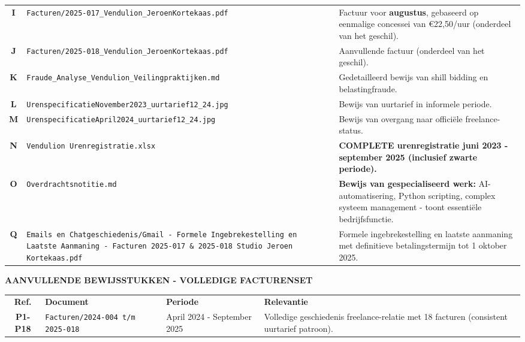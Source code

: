 \documentclass[10pt,a4paper]{article}
\begin{document}
\begin{longtable}{c>{\raggedright}p{6cm}>{\raggedright\arraybackslash}p{8.5cm}}
\textbf{I} & \texttt{Facturen/2025-017\_Vendulion\_JeroenKortekaas.pdf} & Factuur voor \textbf{augustus}, gebaseerd op eenmalige concessei van €22,50/uur (onderdeel van het geschil). \\[0.5em]
\textbf{J} & \texttt{Facturen/2025-018\_Vendulion\_JeroenKortekaas.pdf} & Aanvullende factuur (onderdeel van het geschil). \\[0.5em]
\textbf{K} & \texttt{Fraude\_Analyse\_Vendulion\_Veilingpraktijken.md} & Gedetailleerd bewijs van shill bidding en belastingfraude. \\[0.5em]
\textbf{L} & \texttt{UrenspecificatieNovember2023\_uurtarief12\_24.jpg} & Bewijs van uurtarief in informele periode. \\[0.5em]
\textbf{M} & \texttt{UrenspecificatieApril2024\_uurtarief12\_24.jpg} & Bewijs van overgang naar officiële freelance-status. \\[0.5em]
\textbf{N} & \texttt{Vendulion Urenregistratie.xlsx} & \textbf{COMPLETE urenregistratie juni 2023 - september 2025 (inclusief zwarte periode).} \\[0.5em]
\textbf{O} & \texttt{Overdrachtsnotitie.md} & \textbf{Bewijs van gespecialiseerd werk:} AI-automatisering, Python scripting, complex systeem management - toont essentiële bedrijfsfunctie. \\[0.5em]
\textbf{Q} & \texttt{Emails en Chatgeschiedenis/Gmail - Formele Ingebrekestelling en Laatste Aanmaning - Facturen 2025-017 \& 2025-018 Studio Jeroen Kortekaas.pdf} & Formele ingebrekestelling en laatste aanmaning met definitieve betalingstermijn tot 1 oktober 2025. \\
\end{longtable}

\begin{adjustwidth}{15mm}{15mm}

{\fontsize{10}{15}\selectfont\textbf{AANVULLENDE BEWIJSSTUKKEN - VOLLEDIGE FACTURENSET}}

\end{adjustwidth}

\begin{longtable}{c>{\raggedright}p{4.5cm}>{\raggedright}p{3.5cm}>{\raggedright\arraybackslash}p{6cm}}
\textbf{Ref.} & \textbf{Document} & \textbf{Periode} & \textbf{Relevantie} \\[1em]
\textbf{P1-P18} & \texttt{Facturen/2024-004 t/m 2025-018} & April 2024 - September 2025 & Volledige geschiedenis freelance-relatie met 18 facturen (consistent uurtarief patroon). \\
\end{longtable}
\end{document}

